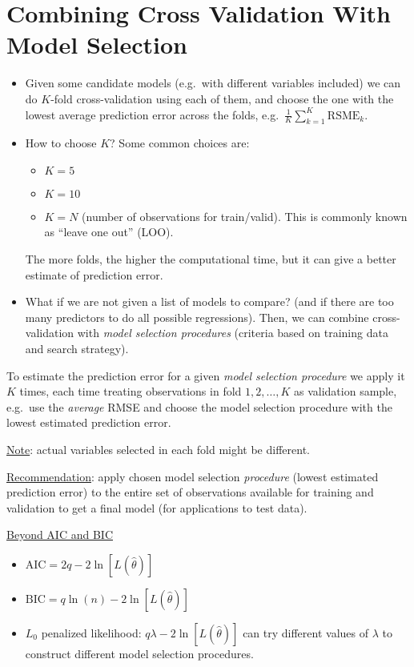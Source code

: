 \section{Combining Cross Validation With Model Selection}
\begin{itemize}
      \item Given some candidate models (e.g.\ with different
            variables included) we can do $ K $-fold
            cross-validation using each of them, and choose the one
            with the lowest average prediction error across
            the folds, e.g.\ $ \displaystyle
                  \frac{1}{K} \sum_{k=1}^{K} \text{RSME}_k $.
      \item How to choose $ K $? Some common choices are:
            \begin{itemize}
                  \item $ K=5 $
                  \item $ K=10 $
                  \item $ K=N $ (number of observations for train/valid).
                        This is commonly known as ``leave one out'' (LOO).
            \end{itemize}
            The more folds, the higher the computational time, but
            it can give a better estimate of prediction error.
      \item What if we are not given a list of models to compare?
            (and if there are too many predictors to do all possible
            regressions). Then, we can combine cross-validation with
            \emph{model selection procedures} (criteria based on training
            data and search strategy).
\end{itemize}
To estimate the prediction error for a given
\emph{model selection procedure} we apply it $ K $ times,
each time treating observations in fold $ 1,2,\ldots,K $
as validation sample, e.g.\ use the \emph{average}
RMSE and choose the model selection procedure
with the lowest estimated prediction error.

\underline{Note}: actual variables selected in each fold might
be different.

\underline{Recommendation}: apply chosen
model selection \emph{procedure} (lowest estimated prediction error)
to the entire set of observations available for training
and validation to get a final model (for applications
to test data).

\underline{Beyond AIC and BIC}
\begin{itemize}
      \item $ \text{AIC}=2q-2\ln[L(\hat{\theta})] $
      \item $ \text{BIC}=q\ln(n)-2\ln[L(\hat{\theta})] $
      \item $ L_0 $ penalized likelihood:
            $ q\lambda -2\ln[L(\hat{\theta})] $ can
            try different values of $ \lambda $ to construct different
            model selection procedures.
\end{itemize}

